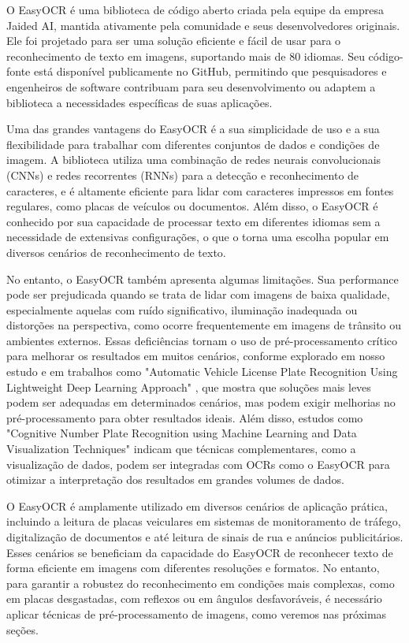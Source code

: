 \documentclass[conference]{IEEEtran}
\begin{document}
O EasyOCR é uma biblioteca de código aberto criada pela equipe da empresa Jaided AI, mantida ativamente pela comunidade e seus desenvolvedores originais. Ele foi projetado para ser uma solução eficiente e fácil de usar para o reconhecimento de texto em imagens, suportando mais de 80 idiomas. Seu código-fonte está disponível publicamente no GitHub, permitindo que pesquisadores e engenheiros de software contribuam para seu desenvolvimento ou adaptem a biblioteca a necessidades específicas de suas aplicações.

Uma das grandes vantagens do EasyOCR é a sua simplicidade de uso e a sua flexibilidade para trabalhar com diferentes conjuntos de dados e condições de imagem. A biblioteca utiliza uma combinação de redes neurais convolucionais (CNNs) e redes recorrentes (RNNs) para a detecção e reconhecimento de caracteres, e é altamente eficiente para lidar com caracteres impressos em fontes regulares, como placas de veículos ou documentos. Além disso, o EasyOCR é conhecido por sua capacidade de processar texto em diferentes idiomas sem a necessidade de extensivas configurações, o que o torna uma escolha popular em diversos cenários de reconhecimento de texto.

No entanto, o EasyOCR também apresenta algumas limitações. Sua performance pode ser prejudicada quando se trata de lidar com imagens de baixa qualidade, especialmente aquelas com ruído significativo, iluminação inadequada ou distorções na perspectiva, como ocorre frequentemente em imagens de trânsito ou ambientes externos. Essas deficiências tornam o uso de pré-processamento crítico para melhorar os resultados em muitos cenários, conforme explorado em nosso estudo e em trabalhos como "Automatic Vehicle License Plate Recognition Using Lightweight Deep Learning Approach" \cite{b5}, que mostra que soluções mais leves podem ser adequadas em determinados cenários, mas podem exigir melhorias no pré-processamento para obter resultados ideais. Além disso, estudos como "Cognitive Number Plate Recognition using Machine Learning and Data Visualization Techniques" \cite{b6} indicam que técnicas complementares, como a visualização de dados, podem ser integradas com OCRs como o EasyOCR para otimizar a interpretação dos resultados em grandes volumes de dados.

O EasyOCR é amplamente utilizado em diversos cenários de aplicação prática, incluindo a leitura de placas veiculares em sistemas de monitoramento de tráfego, digitalização de documentos e até leitura de sinais de rua e anúncios publicitários. Esses cenários se beneficiam da capacidade do EasyOCR de reconhecer texto de forma eficiente em imagens com diferentes resoluções e formatos. No entanto, para garantir a robustez do reconhecimento em condições mais complexas, como em placas desgastadas, com reflexos ou em ângulos desfavoráveis, é necessário aplicar técnicas de pré-processamento de imagens, como veremos nas próximas seções.
\end{document}
